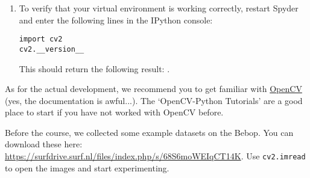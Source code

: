 \documentclass{article}
\begin{document}
\begin{enumerate}

\item To verify that your virtual environment is working correctly, restart Spyder and enter the following lines in the IPython console:
\begin{lstlisting}
import cv2
cv2.__version__
\end{lstlisting}
This should return the following result: .
\end{enumerate}

As for the actual development, we recommend you to get familiar with \href{https://docs.opencv.org/3.4.5/}{OpenCV} (yes, the documentation is awful...). The `OpenCV-Python Tutorials' are a good place to start if you have not worked with OpenCV before.

Before the course, we collected some example datasets on the Bebop. You can download these here: \url{https://surfdrive.surf.nl/files/index.php/s/68S6moWEIqCT14K}. Use \texttt{cv2.imread} to open the images and start experimenting.
\end{document}
